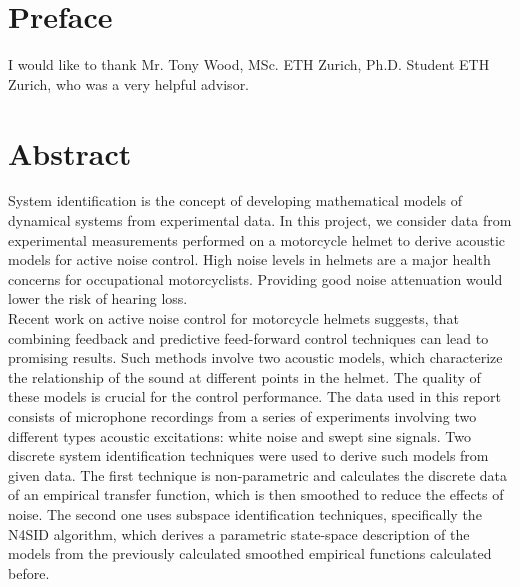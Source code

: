 
\chapter*{Preface}

I would like to thank Mr. Tony Wood, MSc. ETH Zurich, Ph.D. Student ETH Zurich, who was a very helpful advisor.

\cleardoublepage





\setcounter{tocdepth}{2}
\tableofcontents

\cleardoublepage


%
%
%
\cleardoublepage

\chapter*{Abstract}
System identification is the concept of developing mathematical models of dynamical systems from experimental data. In this project, we consider data from experimental measurements performed on a motorcycle helmet to derive acoustic models for active noise control. High noise levels in helmets are a major health concerns for occupational motorcyclists. Providing good noise attenuation would lower the risk of hearing loss.\\

Recent work on active noise control for motorcycle helmets suggests, that combining feedback and predictive feed-forward control techniques can lead to promising results. Such methods involve two acoustic models, which characterize the relationship of the sound at different points in the helmet. The quality of these models is crucial for the control performance. The data used in this report consists of microphone recordings from a series of experiments involving two different types acoustic excitations: white noise and swept sine signals. Two discrete system identification techniques were used to derive such models from given data. The first technique is non-parametric and calculates the discrete data of an empirical transfer function, which is then smoothed to reduce the effects of noise. The second one uses subspace identification techniques, specifically the N4SID algorithm, which derives a parametric state-space description of the models from the previously calculated smoothed empirical functions calculated before. 

\cleardoublepage
